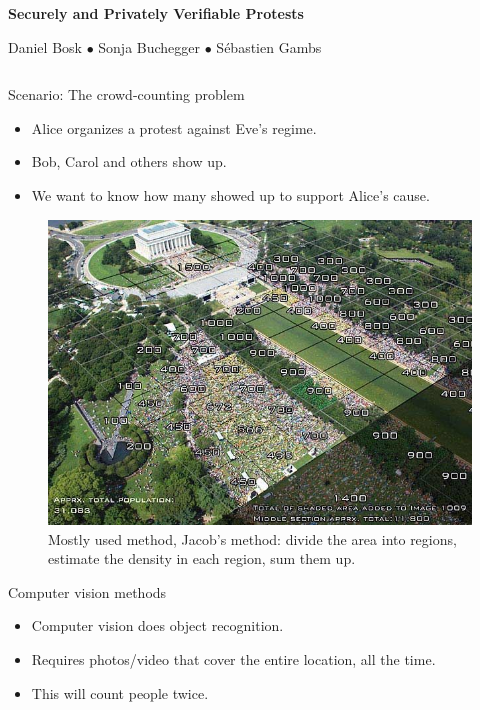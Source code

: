 \begin{center}
  \Huge\bfseries
  Securely and Privately Verifiable Protests
\end{center}
\begin{center}
  \large
  Daniel Bosk $\bullet$ Sonja Buchegger $\bullet$ Sébastien Gambs
\end{center}
\vspace{1.5em}

\begin{columns}[t]

  \begin{column}{0.32\linewidth}

    \begin{blueblock}{Scenario: The crowd-counting problem}
      \begin{itemize}
        \item Alice organizes a protest against Eve's regime.
        \item Bob, Carol and others show up.
        \item We want to know how many showed up to support Alice's cause.
      \end{itemize}
    \end{blueblock}

    \begin{figure}
      \includegraphics[width=0.9\linewidth]{fig/Jacobs-method.jpg}
      \caption{%
        Mostly used method, Jacob's method: divide the area into regions, 
        estimate the density in each region, sum them up.
      }
    \end{figure}

    \begin{orangeblock}{Computer vision methods}
      \begin{itemize}
        \item Computer vision does object recognition.
        \item Requires photos/video that cover the entire location, all the time.
        \item This will count people twice.
      \end{itemize}
    \end{orangeblock}


\end{column}
\end{columns}
